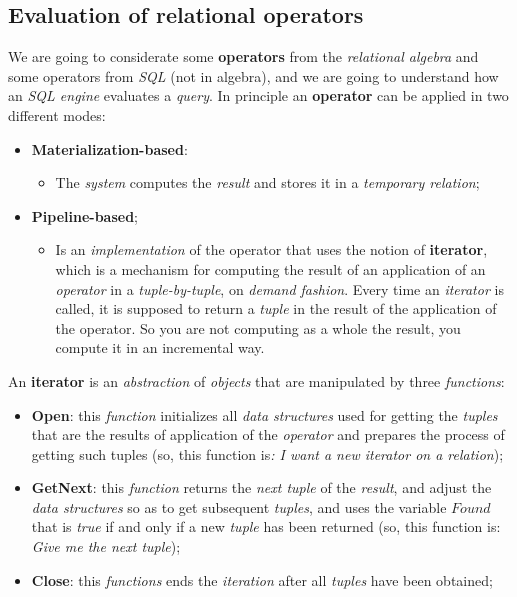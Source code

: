 \documentclass{article}
\begin{document}
\subsection{Evaluation of relational operators}
We are going to considerate some \textbf{operators} from the \emph{relational algebra} and some operators from \emph{SQL} (not in algebra), and we are going to understand how an \emph{SQL engine} evaluates a \emph{query}. In principle an \textbf{operator} can be applied in two different modes:
\begin{itemize}
\item \textbf{Materialization-based}:
\begin{itemize}
\item The \emph{system} computes the \emph{result} and stores it in a \emph{temporary relation};
\end{itemize}
\item \textbf{Pipeline-based};
\begin{itemize}
\item Is an \emph{implementation} of the operator that uses the notion of \textbf{iterator}, which is a mechanism for computing the result of an application of an \emph{operator} in a \emph{tuple-by-tuple}, on \emph{demand fashion}. Every time an \emph{iterator} is called, it is supposed to return a \emph{tuple} in the result of the application of the operator. So you are not computing as a whole the result, you compute it in an incremental way.
\end{itemize}
\end{itemize}
An \textbf{iterator} is an \emph{abstraction} of \emph{objects} that are manipulated by three \emph{functions}:
\begin{itemize}
\item \textbf{Open}: this \emph{function} initializes all \emph{data structures} used for getting the \emph{tuples} that are the results of application of the \emph{operator} and prepares the process of getting such tuples (so, this function is\emph{: I want a new iterator on a relation});
\item \textbf{GetNext}: this \emph{function} returns the \emph{next tuple} of the \emph{result}, and adjust the \emph{data structures} so as to get subsequent \emph{tuples}, and uses the variable $Found$ that is \emph{true} if and only if a new \emph{tuple} has been returned (so, this function is: \emph{Give me the next tuple});
\item \textbf{Close}: this \emph{functions} ends the \emph{iteration} after all \emph{tuples} have been obtained;
\end{itemize}
\end{document}
